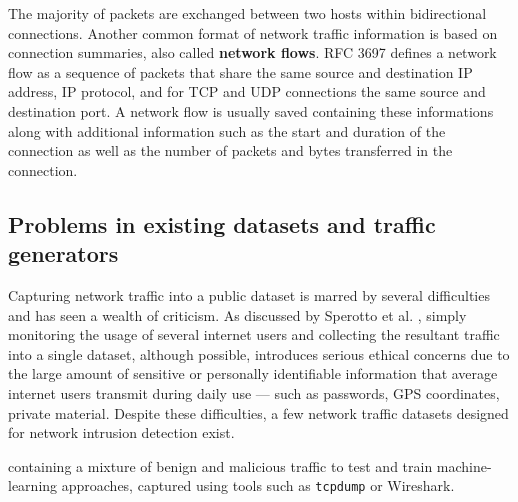 \documentclass[sigconf,anonymous]{acmart}\usepackage[]{graphicx}\usepackage[]{color}
\begin{document}
The majority of packets are exchanged between two hosts within bidirectional connections. Another common format of network traffic information is based on connection summaries, also called \textbf{network flows}. RFC 3697 \cite{brownlee1999traffic} defines a network flow as a sequence of packets that share the same source and destination IP address, IP protocol, and for TCP and UDP connections the same source and destination port. A network flow is usually saved containing these informations along with additional information such as the start and duration of the connection as well as the number of packets and bytes transferred in the connection.


\subsection{Problems in existing datasets and traffic generators}

Capturing network traffic into a public dataset is marred by several difficulties and has seen a wealth of criticism. As discussed by Sperotto et al. \cite{sperotto2009labeled}, simply monitoring the usage of several internet users and collecting the resultant traffic into a single dataset, although possible, introduces serious ethical concerns due to the large amount of sensitive or personally identifiable information that average internet users transmit during daily use --- such as passwords, GPS coordinates, private material. Despite these difficulties, a few network traffic datasets  designed for network intrusion detection exist.

containing a mixture of benign and malicious traffic to test and train machine-learning approaches, captured using tools such as \texttt{tcpdump} or Wireshark. 

\end{document}
